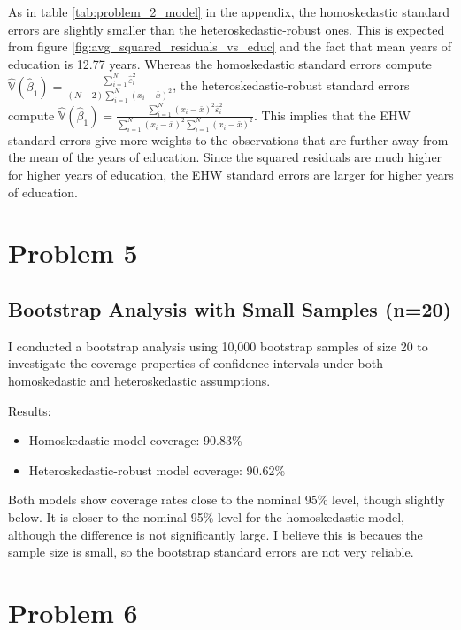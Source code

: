 \documentclass[12pt]{article}
\newcommand{\Var}{\mathbb{V}}
\begin{document}
As in table \ref{tab:problem_2_model} in the appendix, the homoskedastic standard errors are slightly smaller than the heteroskedastic-robust ones.
This is expected from figure \ref{fig:avg_squared_residuals_vs_educ} and the fact that mean years of education is 12.77 years.
Whereas the homoskedastic standard errors compute $\hat{\Var}({\hat\beta_1}) = \frac{\sum_{i=1}^N \hat\varepsilon_i^2}{(N-2)\sum_{i=1}^N (x_i - \bar{x})^2}$, the heteroskedastic-robust standard errors compute $\hat{\Var}({\hat\beta_1} )= \frac{\sum_{i=1}^N (x_i - \bar{x})^2 \hat\varepsilon_i^2}{\sum_{i=1}^N (x_i - \bar{x})^2 \sum_{i=1}^N (x_i - \bar{x})^2}$.
This implies that the EHW standard errors give more weights to the observations that are further away from the mean of the years of education. Since the squared residuals are much higher for higher years of education, the EHW standard errors are larger for higher years of education.


\section{Problem 5}

\subsection{Bootstrap Analysis with Small Samples (n=20)}

I conducted a bootstrap analysis using 10,000 bootstrap samples of size 20 to investigate the coverage properties of confidence intervals under both homoskedastic and heteroskedastic assumptions.

Results:
\begin{itemize}
    \item Homoskedastic model coverage: 90.83\%
    \item Heteroskedastic-robust model coverage: 90.62\%
\end{itemize}

Both models show coverage rates close to the nominal 95\% level, though slightly below. It is closer to the nominal 95\% level for the homoskedastic model, although the difference is not significantly large.
I believe this is becaues the sample size is small, so the bootstrap standard errors are not very reliable.

\section{Problem 6}
\end{document}
